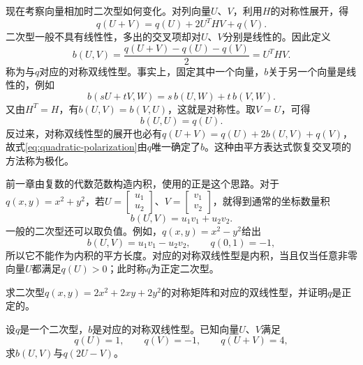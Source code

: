 现在考察向量相加时二次型如何变化。对列向量\(U\)、\(V\)，利用\(H\)的对称性展开，得
\begin{equation}
    q(U+V) = q(U) + 2U^{T} H V + q(V) .
\end{equation}
二次型一般不具有线性性，多出的交叉项却对\(U\)、\(V\)分别是线性的。因此定义
\begin{equation}\label{eq:quadratic-polarization}
    b(U,V) = \frac{q(U+V)-q(U)-q(V)}{2} = U^{T} H V .
\end{equation}
称为与\(q\)对应的{\heiti{}对称双线性型}。事实上，固定其中一个向量，\(b\)关于另一个向量是线性的，例如
\begin{equation}
    b(sU+tV,W) = s\,b(U,W) + t\,b(V,W) .
\end{equation}
又由\(H^{T} = H\)，有\(b(U,V) = b(V,U)\)，这就是对称性。取\(V = U\)，可得
\begin{equation}
    b(U,U) = q(U) .
\end{equation}
反过来，对称双线性型的展开也必有\(q(U+V) = q(U) + 2b(U,V) + q(V)\)，故式\eqref{eq:quadratic-polarization}由\(q\)唯一确定了\(b\)。这种由平方表达式恢复交叉项的方法称为{\heiti{}极化}。

前一章由复数的代数范数构造内积，使用的正是这个思路。对于\(q(x,y) = x^{2} + y^{2}\)，若\(U = \left[\begin{matrix}u_1 \\ u_2\end{matrix}\right]\)、\(V = \left[\begin{matrix}v_1 \\ v_2\end{matrix}\right]\)，就得到通常的坐标数量积
\begin{equation}
    b(U,V) = u_1 v_1 + u_2 v_2 .
\end{equation}
一般的二次型还可以取负值。例如，\(q(x,y) = x^{2} - y^{2}\)给出
\begin{equation}
    b(U,V) = u_1 v_1 - u_2 v_2 , \qquad q(0,1) = -1 ,
\end{equation}
所以它不能作为内积的平方长度。对应的对称双线性型是内积，当且仅当任意非零向量\(U\)都满足\(q(U) > 0\)；此时称\(q\)为{\heiti{}正定二次型}。

\begin{example}\label{ex:quadratic-form-matrix}
求二次型\(q(x,y) = 2x^{2} + 2xy + 2y^{2}\)的对称矩阵和对应的双线性型，并证明\(q\)是正定的。
\end{example}

\begin{example}\label{ex:quadratic-polarization-values}
设\(q\)是一个二次型，\(b\)是对应的对称双线性型。已知向量\(U\)、\(V\)满足
\begin{equation*}
    q(U)=1 , \qquad q(V)=-1 , \qquad q(U+V)=4 ,
\end{equation*}
求\(b(U,V)\)与\(q(2U-V)\)。
\end{example}

